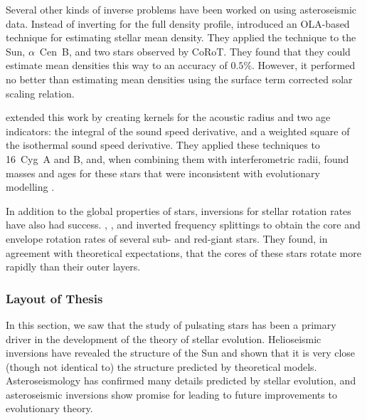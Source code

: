 
Several other kinds of inverse problems have been worked on using asteroseismic data. 
Instead of inverting for the full density profile, \citet{2012A&A...539A..63R} introduced an OLA-based technique for estimating stellar mean density. 
They applied the technique to the Sun, $\alpha$~Cen~B, and two stars observed by CoRoT. 
They found that they could estimate mean densities this way to an accuracy of $0.5\%$. 
However, it performed no better than estimating mean densities using the \citet{2008ApJ...683L.175K} surface term corrected solar scaling relation. 

\citet{2015A&A...583A..62B, 2015A&A...574A..42B} extended this work by creating kernels for the acoustic radius and two age indicators: the integral of the sound speed derivative, and a weighted square of the isothermal sound speed derivative. 
They applied these techniques to 16~Cyg~A and B, and, when combining them with interferometric radii, found masses and ages for these stars that were inconsistent with evolutionary modelling \citep{2016A&A...585A.109B, 2016A&A...596A..73B}. 

In addition to the global properties of stars, inversions for stellar rotation rates have also had success. 
\citet{2012ApJ...756...19D, 2014A&A...564A..27D}, \citet{2016ApJ...817...65D}, and \citet{2017A&A...602A..62T} inverted frequency splittings to obtain the core and envelope rotation rates of several sub- and red-giant stars. 
They found, in agreement with theoretical expectations, that the cores of these stars rotate more rapidly than their outer layers. 

\newpage
\subsubsection*{Layout of Thesis}
In this section, we saw that the study of pulsating stars has been a primary driver in the development of the theory of stellar evolution. 
Helioseismic inversions have revealed the structure of the Sun and shown that it is very close (though not identical to) the structure predicted by theoretical models. 
Asteroseismology has confirmed many details predicted by stellar evolution, and asteroseismic inversions show promise for leading to future improvements to evolutionary theory. 

